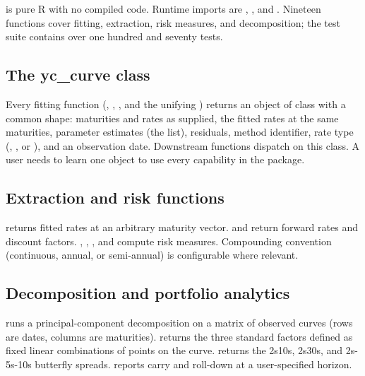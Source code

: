  is pure R with no compiled code. Runtime
imports are , , and .
Nineteen functions cover fitting, extraction, risk measures, and
decomposition; the test suite contains over one hundred and
seventy tests.

\subsection{The yc\_curve class}\label{the-yc_curve-class}

Every fitting function (,
, , and the unifying
) returns an object of class  with a
common shape: maturities and rates as supplied, the fitted rates at
the same maturities, parameter estimates (the  list),
residuals, method identifier, rate type (,
, or ), and an observation date.
Downstream functions dispatch on this class. A user needs to learn
one object to use every capability in the package.

\subsection{Extraction and risk functions}\label{extraction-and-risk-functions}

 returns fitted rates at an arbitrary maturity
vector.  and  return
forward rates and discount factors. ,
, , and
 compute risk measures.
Compounding convention (continuous, annual, or semi-annual) is
configurable where relevant.

\subsection{Decomposition and portfolio analytics}\label{decomposition-and-portfolio-analytics}

 runs a principal-component decomposition on a
matrix of observed curves (rows are dates, columns are maturities).
 returns the three standard
factors defined as fixed linear combinations of points on the
curve.  returns the 2s10s, 2s30s, and 2s-5s-10s
butterfly spreads.  reports carry and roll-down
at a user-specified horizon.

